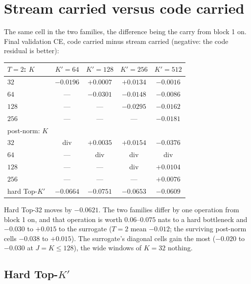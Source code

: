 \documentclass[11pt,a4paper]{article}
\newcommand{\Kp}{K'}
\begin{document}
\section{Stream carried versus code carried}

The same cell in the two families, the difference being the carry from
block 1 on. Final validation CE, code carried minus stream carried
(negative: the code residual is better):

\begin{center}\small
\begin{tabular}{lcccc}
\toprule
$T=2$: $K$ & $\Kp{=}64$ & $\Kp{=}128$ & $\Kp{=}256$ & $\Kp{=}512$ \\
\midrule
$32$   & $-0.0196$ & $+0.0007$ & $+0.0134$ & $-0.0016$ \\
$64$   & ---       & $-0.0301$ & $-0.0148$ & $-0.0086$ \\
$128$  & ---       & ---       & $-0.0295$ & $-0.0162$ \\
$256$  & ---       & ---       & ---       & $-0.0181$ \\
\midrule
post-norm: $K$ & & & & \\
\midrule
$32$   & div       & $+0.0035$ & $+0.0154$ & $-0.0376$ \\
$64$   & ---       & div       & div       & div \\
$128$  & ---       & ---       & div       & $+0.0104$ \\
$256$  & ---       & ---       & ---       & $+0.0076$ \\
\midrule
hard Top-$\Kp$ & $-0.0664$ & $-0.0751$ & $-0.0653$ & $-0.0609$ \\
\bottomrule
\end{tabular}
\end{center}

Hard Top-32 moves by $-0.0621$. The two families differ by one operation
from block 1 on, and that operation is worth $0.06$--$0.075$ nats to a hard
bottleneck and $-0.030$ to $+0.015$ to the surrogate ($T=2$ mean $-0.012$;
the surviving post-norm cells $-0.038$ to $+0.015$). The surrogate's
diagonal cells gain the most ($-0.020$ to $-0.030$ at $J = K \le 128$),
the wide windows of $K=32$ nothing.

\subsection*{Hard Top-$\Kp$}
\end{document}
